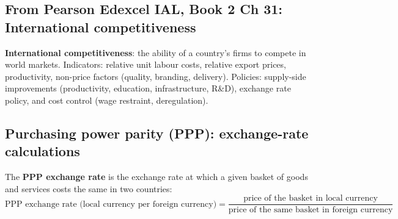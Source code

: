 \documentclass[a4paper,12pt]{article}
\newcommand{\needbold}[1]{\textcolor{red!70!black}{\textbf{#1}}}
\begin{document}
\subsection*{From Pearson Edexcel IAL, Book 2 Ch 31: International competitiveness}\label{sec:add-competitiveness}
\needbold{International competitiveness}: the ability of a country's firms to compete in world markets. Indicators: relative unit labour costs, relative export prices, productivity, non-price factors (quality, branding, delivery). Policies: supply-side improvements (productivity, education, infrastructure, R\&D), exchange rate policy, and cost control (wage restraint, deregulation).

\subsection*{Purchasing power parity (PPP): exchange-rate calculations}\label{sec:add-ppp}
The \needbold{PPP exchange rate} is the exchange rate at which a given basket of goods and services costs the same in two countries:
\[\text{PPP exchange rate (local currency per foreign currency)} = \dfrac{\text{price of the basket in local currency}}{\text{price of the same basket in foreign currency}}\]
\end{document}
